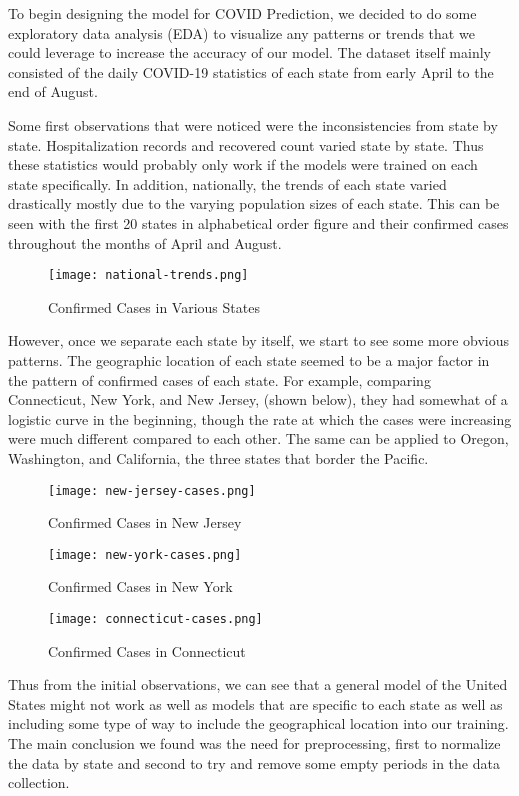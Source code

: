 \documentclass[sigconf]{acmart}
\begin{document}
To begin designing the model for COVID Prediction, we decided to do some exploratory data analysis (EDA) to visualize any patterns or trends that we could leverage to increase the accuracy of our model. The dataset itself mainly consisted of the daily COVID-19 statistics of each state from early April to the end of August.

Some first observations that were noticed were the inconsistencies from state by state. Hospitalization records and recovered count varied state by state. Thus these statistics would probably only work if the models were trained on each state specifically. In addition, nationally, the trends of each state varied drastically mostly due to the varying population sizes of each state. This can be seen with the first 20 states in alphabetical order figure and their confirmed cases throughout the months of April and August.

\begin{figure}
  \centering
  \texttt{[image: national-trends.png]}
  \caption{Confirmed Cases in Various States}
\end{figure}

However, once we separate each state by itself, we start to see some more obvious patterns. The geographic location of each state seemed to be a major factor in the pattern of confirmed cases of each state. For example, comparing Connecticut, New York, and New Jersey, (shown below), they had somewhat of a logistic curve in the beginning, though the rate at which the cases were increasing were much different compared to each other. The same can be applied to Oregon, Washington, and California, the three states that border the Pacific. 

\begin{figure}
  \centering
  \texttt{[image: new-jersey-cases.png]}
  \caption{Confirmed Cases in New Jersey}
\end{figure}

\begin{figure}
  \texttt{[image: new-york-cases.png]}
  \caption{Confirmed Cases in New York}
\end{figure}

\begin{figure}
  \texttt{[image: connecticut-cases.png]}
  \caption{Confirmed Cases in Connecticut}
\end{figure}

Thus from the initial observations, we can see that a general model of the United States might not work as well as models that are specific to each state as well as including some type of way to include the geographical location into our training. The main conclusion we found was the need for preprocessing, first to normalize the data by state and second to try and remove some empty periods in the data collection.
\end{document}

